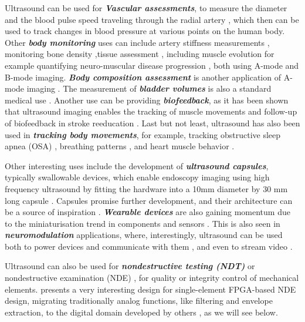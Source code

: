 \documentclass{article}
\begin{document}
Ultrasound can be used for \textbf{\textit{Vascular assessments}}, to measure the diameter and the blood pulse speed traveling through the radial artery \cite{worthing_using_2016}, which then can be used to track changes in blood pressure at various points on the human body. Other \textbf{\textit{body monitoring}} uses can include artery stiffness measurements \cite{joseph_technical_2015, joseph_artsenstouch_2015, seo_non-invasive_2018}, monitoring bone density \cite{wahab_design_2016, fontes-pereira_monitoring_2018},tissue assessment \cite{keyes_electrical_2017}, including muscle evolution \cite{brausch_towards_2019} for example quantifying neuro-muscular disease progression \cite{zhang_design_2015}, both using A-mode and B-mode imaging. \textbf{\textit{Body composition assessment}} is another application of A-mode imaging \cite{wagner_validity_2016, martins_-scan_2017}. The measurement of \textbf{\textit{bladder volumes}} is also a standard medical use \cite{kuru_feasibility_2019}. Another use can be providing \textbf{\textit{biofeedback}}, as it has been shown that ultrasound imaging enables the tracking of muscle movements \cite{sikdar_novel_2014} and follow-up of biofeedback in stroke reeducation \cite{sosnowska_training_2019}. Last but not least, ultrasound has also been used in \textbf{\textit{tracking body movements}}, for example, tracking obstructive sleep apnea (OSA) \cite{weng_fpga-based_2015}, breathing patterns \cite{shahshahani_ultrasound_2018}, and heart muscle behavior \cite{nguyen_estimating_2019}.

Other interesting uses include the development of \textbf{\textit{ultrasound capsules}}, typically swallowable devices, which enable endoscopy imaging using high frequency ultrasound by fitting the hardware into a 10mm diameter by 30 mm long capsule \cite{cox_ultrasound_2017, wang_development_2017}. Capsules promise further development, and their architecture can be a source of inspiration \cite{lee_towards_2014, memon_capsule_2016, lay_progress_2016, lay_-vivo_2018}. \textbf{\textit{Wearable devices}} are also gaining momentum due to the miniaturisation trend in components and sensors \cite{basak_wearable_2013}. This is also seen in \textbf{\textit{neuromodulation}} \cite{pashaei_flexible_2020} applications, where, interestingly, ultrasound can be used both to power devices and communicate with them \cite{johnson_stimdust_2018, seo_wireless_2016, santagati_design_2020}, and even to stream video \cite{kou_real-time_2020}.

Ultrasound can also be used for \textbf{\textit{nondestructive testing (NDT)}} or nondestructive examination (NDE)  \cite{duncan_real-time_1990,noauthor_integration_nodate}, for quality or integrity control of mechanical elements. \cite{fritsch_full_nodate} presents a very interesting design for single-element FPGA-based NDE design, migrating traditionally analog functions, like filtering and envelope extraction, to the digital domain developed by others  \cite{triger_modular_2008, shrisha_fpga_2018, rodriguez-olivares_improvement_2018}, as we will see below. 
\end{document}
